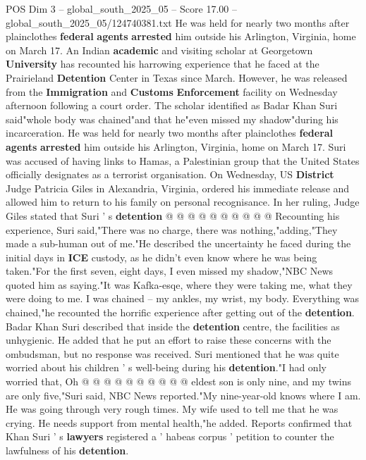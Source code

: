 \begin{textsample}{POS Dim 3 – global\_south\_2025\_05 – Score 17.00 – global\_south\_2025\_05/124740381.txt}  \label{ex:f3_pos_286}
He was held for nearly two months after plainclothes \textbf{federal} \textbf{agents} \textbf{arrested} him outside his Arlington, Virginia, home on March 17.
An Indian \textbf{academic} and visiting scholar at Georgetown \textbf{University} has recounted his harrowing experience that he faced at the Prairieland \textbf{Detention} Center in Texas since March.
However, he was released from the \textbf{Immigration} and \textbf{Customs} \textbf{Enforcement} facility on Wednesday afternoon following a court order.
The scholar identified as Badar Khan Suri said"whole body was chained"and that he"even missed my shadow"during his incarceration.
He was held for nearly two months after plainclothes \textbf{federal} \textbf{agents} \textbf{arrested} him outside his Arlington, Virginia, home on March 17.
Suri was accused of having links to Hamas, a Palestinian group that the United States officially designates as a terrorist organisation.
On Wednesday, US \textbf{District} Judge Patricia Giles in Alexandria, Virginia, ordered his immediate release and allowed him to return to his family on personal recognisance.
In her ruling, Judge Giles stated that Suri ' s \textbf{detention} @ @ @ @ @ @ @ @ @ @ Recounting his experience, Suri said,"There was no charge, there was nothing,"adding,"They made a sub-human out of me."He described the uncertainty he faced during the initial days in \textbf{ICE} custody, as he didn't even know where he was being taken."For the first seven, eight days, I even missed my shadow,"NBC News quoted him as saying."It was Kafka-esqe, where they were taking me, what they were doing to me.
I was chained -- my ankles, my wrist, my body.
Everything was chained,"he recounted the horrific experience after getting out of the \textbf{detention}.
Badar Khan Suri described that inside the \textbf{detention} centre, the facilities as unhygienic.
He added that he put an effort to raise these concerns with the ombudsman, but no response was received.
Suri mentioned that he was quite worried about his children ' s well-being during his \textbf{detention}."I had only worried that, Oh @ @ @ @ @ @ @ @ @ @ eldest son is only nine, and my twins are only five,"Suri said, NBC News reported."My nine-year-old knows where I am.
He was going through very rough times.
My wife used to tell me that he was crying.
He needs support from mental health,"he added.
Reports confirmed that Khan Suri ' s \textbf{lawyers} registered a ' habeas corpus ' petition to counter the lawfulness of his \textbf{detention}.

\end{textsample}
